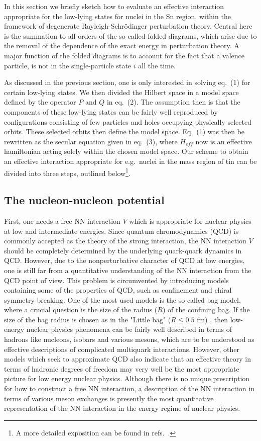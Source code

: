 
In this section we briefly sketch how to evaluate an effective
interaction appropriate for the 
low-lying states for nuclei in the Sn region, within the framework
of degenerate Rayleigh-Schr\"{o}dinger perturbation theory. Central
here is the summation to all orders of the so-called folded diagrams,
which arise due to the removal of the dependence of the exact energy 
in perturbation theory. A major function of the folded diagrams
is to account for the fact that a valence particle, is not
in the single-particle state $i$ all the time.

As discussed in the previous section,
one is only interested in solving eq.\ (1)
for certain
low-lying states. We then divided the Hilbert space
in a model space defined by the operator $P$
and $Q$ in eq.\ (2).
The assumption then is that the components of these low-lying
states can be fairly well reproduced by configurations consisting
of few particles and holes occupying physically selected orbits.
These selected orbits then define the model space.
Eq.\ (1)  was then be rewritten as the secular equation given in eq.\ (3),
where $H_{eff}$  now is an effective hamiltonian acting solely
within the chosen model space.
Our scheme to obtain an effective interaction appropriate for e.g.\
nuclei in the mass region of tin  can be divided into three steps,
outlined below\footnote{A  more detailed
exposition can be found in refs.\ \cite{ko90,hko94}.}. 

\subsection{The nucleon-nucleon potential}

First, one needs a free NN interaction $V$ which is
appropriate for nuclear physics at low and intermediate energies. 
Since quantum chromodynamics (QCD) is commonly
accepted as the theory of the strong interaction, the
NN interaction $V$ should be  completely determined by the underlying
quark-quark dynamics in QCD. However, due to the nonperturbative
character of QCD at low energies, one is still far from a
quantitative understanding of the NN interaction from the QCD point of
view. This problem is circumvented by introducing
models containing some of the properties of QCD, such as
confinement and chiral symmetry breaking. One of the most used models
is the so-called bag model, where a crucial question is the
size of the radius ($R$) of the confining bag. If the size of the bag radius
is chosen as in the "Little bag" ($R\leq 0.5$ fm) \cite{br79}, then
low-energy nuclear physics phenomena can be fairly well described
in terms of hadrons like nucleons, isobars and various mesons,
which are to be understood as effective descriptions of complicated
multiquark interactions.
However, other models which
seek to approximate QCD also indicate that an effective theory in terms
of hadronic degrees of freedom may very well be the most appropriate
picture for low energy nuclear physics.
Although there is no unique prescription for how to construct
a free NN interaction, a description
of the NN interaction in terms of various meson exchanges is presently
the most quantitative representation of the NN interaction
\cite{mac89}
in the energy regime of nuclear physics.

